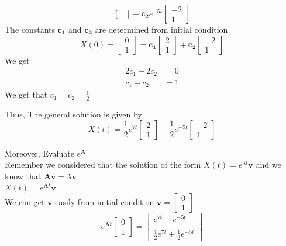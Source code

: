 \begin{example}
\[\begin{bmatrix}
        \end{bmatrix}
        + \mathbf{c_2}e^{-5t}\begin{bmatrix}
            -2 \\1
        \end{bmatrix}
    \]
    The constants $\mathbf{c_1}$ and $\mathbf{c_2}$ are determined from initial condition
    \[
        X(0) =\begin{bmatrix}
            0 \\1
        \end{bmatrix} =
        \mathbf{c_1} \begin{bmatrix}
            2 \\1
        \end{bmatrix}
        + \mathbf{c_2}\begin{bmatrix}
            -2 \\1
        \end{bmatrix}
    \]
    We get
    \begin{align*}
        2c_1 - 2 c_2 & = 0
        \\
        c_1 + c_2    & = 1
    \end{align*}
    We get that $c_1 =  c_2 = \frac{1}{2}$

    Thus, The general solution is given by
    \[
        X(t) =\frac{1}{2} e^{7t}\begin{bmatrix}
            2 \\1
        \end{bmatrix}
        +\frac{1}{2}e^{-5t}\begin{bmatrix}
            -2 \\1
        \end{bmatrix}
    \]
\end{example}
Moreover, Evaluate $e^{\mathbf{A}}$\\
Remember we considered that the solution of the form $X(t) = e^{\lambda t} \mathbf{v}$ and we know that $\mathbf{A}\mathbf{v} = \lambda \mathbf{v}$\\
$X(t) = e^{\mathbf{A} t} \mathbf{v}$\\
We can get $\mathbf{v}$ easily from initial condition $\mathbf{v} =
    \begin{bmatrix}
        0 \\
        1
    \end{bmatrix}
$
\[
    e^{\mathbf{A} t}
    \begin{bmatrix}
        0 \\
        1
    \end{bmatrix}=\begin{bmatrix}
        e^{7t}   -e^{-5t}
        \\\\
        \frac{1}{2}e^{7t} + \frac{1}{2}e^{-5t}
    \end{bmatrix}
\]
